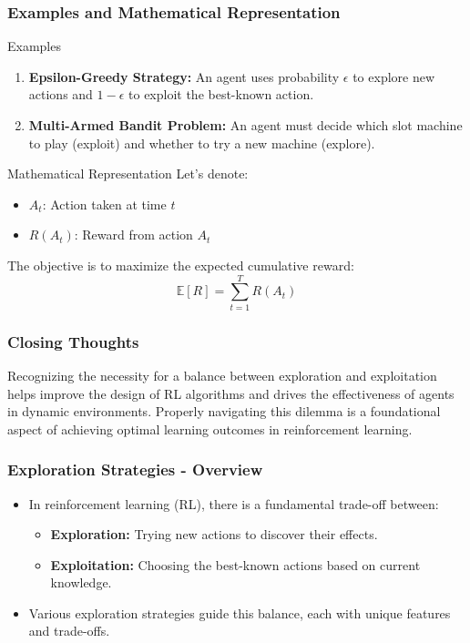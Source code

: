 \documentclass{beamer}
\begin{document}
\begin{frame}[fragile]
    \frametitle{Examples and Mathematical Representation}
    \begin{block}{Examples}
        \begin{enumerate}
            \item \textbf{Epsilon-Greedy Strategy:} 
            An agent uses probability $\epsilon$ to explore new actions and $1-\epsilon$ to exploit the best-known action.
            \item \textbf{Multi-Armed Bandit Problem:} 
            An agent must decide which slot machine to play (exploit) and whether to try a new machine (explore).
        \end{enumerate}
    \end{block}
    
    \begin{block}{Mathematical Representation}
        Let's denote:
        \begin{itemize}
            \item $A_t$: Action taken at time $t$
            \item $R(A_t)$: Reward from action $A_t$
        \end{itemize}
        The objective is to maximize the expected cumulative reward:
        \begin{equation} 
        \mathbb{E}\left[R\right] = \sum_{t=1}^{T} R(A_t)
        \end{equation}
    \end{block}
\end{frame}

\begin{frame}[fragile]
    \frametitle{Closing Thoughts}
    Recognizing the necessity for a balance between exploration and exploitation helps improve the design of RL algorithms and drives the effectiveness of agents in dynamic environments. Properly navigating this dilemma is a foundational aspect of achieving optimal learning outcomes in reinforcement learning.
\end{frame}

\begin{frame}[fragile]
    \frametitle{Exploration Strategies - Overview}
    \begin{itemize}
        \item In reinforcement learning (RL), there is a fundamental trade-off between:
        \begin{itemize}
            \item \textbf{Exploration:} Trying new actions to discover their effects.
            \item \textbf{Exploitation:} Choosing the best-known actions based on current knowledge.
        \end{itemize}
        \item Various exploration strategies guide this balance, each with unique features and trade-offs.
    \end{itemize}
\end{frame}
\end{document}
